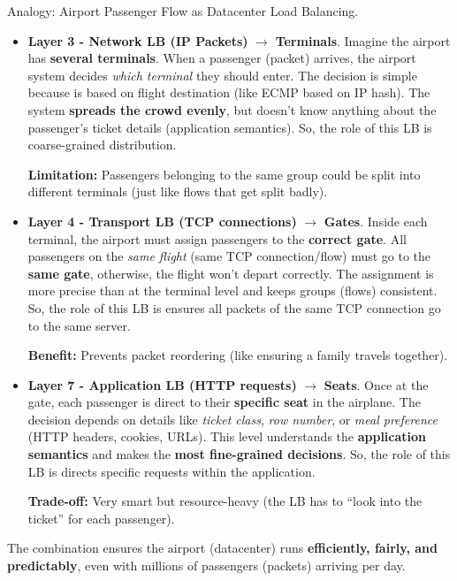 \highspace
\begin{examplebox}
    Analogy: Airport Passenger Flow as Datacenter Load Balancing.
    \begin{itemize}
        \item \textbf{Layer 3 - Network LB (IP Packets)} $\rightarrow$ \textbf{Terminals}. Imagine the airport has \textbf{several terminals}. When a passenger (packet) arrives, the airport system decides \emph{which terminal} they should enter. The decision is simple because is based on flight destination (like ECMP based on IP hash). The system \textbf{spreads the crowd evenly}, but doesn't know anything about the passenger's ticket details (application semantics). So, the role of this LB is coarse-grained distribution.

        \textcolor{Red2}{ \textbf{Limitation:}} Passengers belonging to the same group could be split into different terminals (just like flows that get split badly).


        \item \textbf{Layer 4 - Transport LB (TCP connections)} $\rightarrow$ \textbf{Gates}. Inside each terminal, the airport must assign passengers to the \textbf{correct gate}. All passengers on the \emph{same flight} (same TCP connection/flow) must go to the \textbf{same gate}, otherwise, the flight won't depart correctly. The assignment is more precise than at the terminal level and keeps groups (flows) consistent. So, the role of this LB is ensures all packets of the same TCP connection go to the same server.
        
        \textcolor{Green3}{ \textbf{Benefit:}} Prevents packet reordering (like ensuring a family travels together).


        \item \textbf{Layer 7 - Application LB (HTTP requests)} $\rightarrow$ \textbf{Seats}. Once at the gate, each passenger is direct to their \textbf{specific seat} in the airplane. The decision depends on details like \emph{ticket class}, \emph{row number}, or \emph{meal preference} (HTTP headers, cookies, URLs). This level understands the \textbf{application semantics} and makes the \textbf{most fine-grained decisions}. So, the role of this LB is directs specific requests within the application.
        
        \textcolor{Red2}{ \textbf{Trade-off:}} Very smart but resource-heavy (the LB has to ``look into the ticket'' for each passenger).
    \end{itemize}
    The combination ensures the airport (datacenter) runs \textbf{efficiently, fairly, and predictably}, even with millions of passengers (packets) arriving per day.
\end{examplebox}